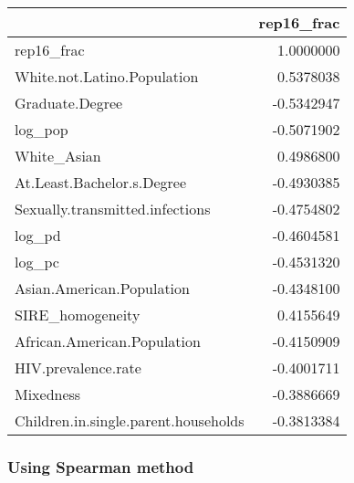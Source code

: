 \documentclass[
]{article}
\begin{document}
\begin{longtable}[]{@{}lr@{}}
\toprule
& rep16\_frac \\
\midrule
\endhead
rep16\_frac & 1.0000000 \\
White.not.Latino.Population & 0.5378038 \\
Graduate.Degree & -0.5342947 \\
log\_pop & -0.5071902 \\
White\_Asian & 0.4986800 \\
At.Least.Bachelor.s.Degree & -0.4930385 \\
Sexually.transmitted.infections & -0.4754802 \\
log\_pd & -0.4604581 \\
log\_pc & -0.4531320 \\
Asian.American.Population & -0.4348100 \\
SIRE\_homogeneity & 0.4155649 \\
African.American.Population & -0.4150909 \\
HIV.prevalence.rate & -0.4001711 \\
Mixedness & -0.3886669 \\
Children.in.single.parent.households & -0.3813384 \\
\bottomrule
\end{longtable}

\hypertarget{using-spearman-method}{%
\subsubsection{Using Spearman method}\label{using-spearman-method}}
\end{document}
